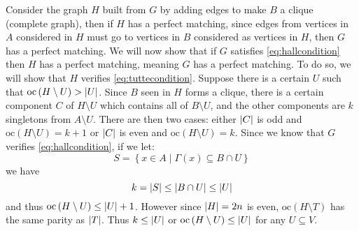 \documentclass[math]{cours}
\def\oc{\mathrm{oc}}
\begin{document}
Consider the graph $H$ built from $G$ by adding edges to make $B$ a clique (complete graph), then if $H$ has a perfect matching, since edges from vertices in $A$ considered in $H$ must go to vertices in $B$ considered as vertices in $H$, then $G$ has a perfect matching.
We will now show that if $G$ satisfies \ref{eq:hallcondition} then $H$ has a perfect matching, meaning $G$ has a perfect matching.
To do so, we will show that $H$ verifies \ref{eq:tuttecondition}. Suppose there is a certain $U$ such that $\oc\left(H \setminus U\right) > \abs{U}$.
Since $B$ seen in $H$ forms a clique, there is a certain component $C$ of $H \setminus U$ which contains all of $B \setminus U$, and the other components are $k$ singletons from $A \setminus U$.
There are then two cases: either $\left|C\right|$ is odd and $\oc\left(H \setminus U\right) = k + 1$ or $\left|C\right|$ is even and $\oc\left(H \setminus U\right) = k$.
Since we know that $G$ verifies \ref{eq:hallcondition}, if we let:
\begin{equation*}
	S = \left\{x \in A\mid \Gamma(x) \subseteq B \cap U \right\}
\end{equation*}
we have
\begin{equation*}
	k = \left|S\right| \leq \left|B \cap U\right| \leq \left|U\right|
\end{equation*}
and thus $\oc\left(H \setminus U \right) \leq \abs{U} + 1$.
However since $\left|H\right| = 2n$ is even, $\oc\left(H \setminus T \right)$ has the same parity as $\left|T\right|$.
Thus $k \leq \left|U\right|$ or $\oc\left(H \setminus U \right) \leq \abs{U}$ for any $U \subseteq V$.
\end{document}
